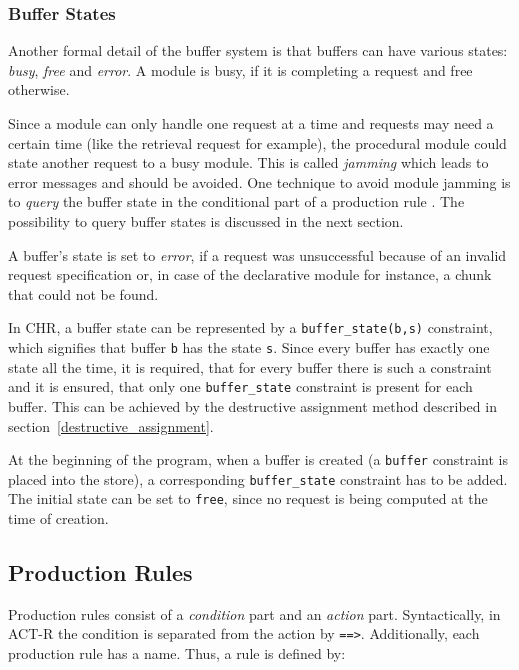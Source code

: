 \subsubsection{Buffer States}

Another formal detail of the buffer system is that buffers can have various states: \emph{busy}, \emph{free} and \emph{error}. A module is busy, if it is completing a request and free otherwise.

Since a module can only handle one request at a time and requests may need a certain time (like the retrieval request for example), the procedural module could state another request to a busy module. This is called \emph{jamming} which leads to error messages and should be avoided. One technique to avoid module jamming is to \emph{query} the buffer state in the conditional part of a production rule \cite[unit 2, p. 9]{actr_tutorial}. The possibility to query buffer states is discussed in the next section.

A buffer's state is set to \emph{error}, if a request was unsuccessful because of an invalid request specification or, in case of the declarative module for instance, a chunk that could not be found.

In CHR, a buffer state can be represented by a \lstinline|buffer_state(b,s)| constraint, which signifies that buffer \lstinline|b| has the state \lstinline|s|. Since every buffer has exactly one state all the time, it is required, that for every buffer there is such a constraint and it is ensured, that only one \lstinline|buffer_state| constraint is present for each buffer. This can be achieved by the destructive assignment method described in section~\ref{destructive_assignment}. 

At the beginning of the program, when a buffer is created (a \lstinline|buffer| constraint is placed into the store), a corresponding \lstinline|buffer_state| constraint has to be added. The initial state can be set to \lstinline|free|, since no request is being computed at the time of creation.

\subsection{Production Rules}

Production rules consist of a \emph{condition} part and an \emph{action} part. Syntactically, in ACT-R the condition is separated from the action by \lstinline|==>|. Additionally, each production rule has a name. Thus, a rule is defined by:

